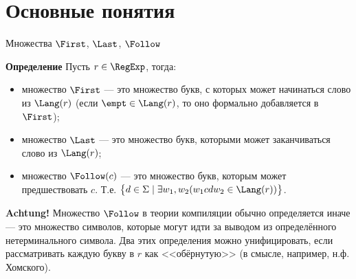 \section{Основные понятия}

\begin{frame}{Множества $\First$, $\Last$, $\Follow$}
  \vspace{-5pt}%
  \begin{block}{\bf Определение}
    Пусть $r\in\RegExp$, тогда:
    \begin{itemize}
      \item множество $\First$ --- это множество букв, с которых может начинаться слово из $\Lang(r)$ (если $\empt\in\Lang(r)$, то оно формально добавляется в $\First$);
      \item множество $\Last$ --- это множество букв, которыми может заканчиваться слово из $\Lang(r)$;
      \item множество $\Follow(c)$ --- это множество букв, которым может предшествовать $c$. Т.е. $\bigl\lbrace d\in\Sigma\mid \exists w_1,w_2(w_1 c d w_2\in\Lang(r))\bigr\rbrace$.
    \end{itemize}
  \end{block} %

  \begin{alertblock}{\bf Achtung!}
    \small
    Множество $\Follow$ в теории компиляции обычно определяется иначе --- это множество символов, которые могут идти за выводом из определённого нетерминального символа. Два этих определения можно унифицировать, если рассматривать каждую букву в $r$ как <<обёрнутую>> (в смысле, например, н.ф. Хомского).
  \end{alertblock} %
\end{frame}

